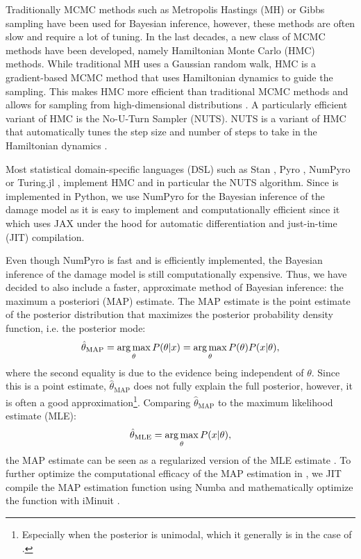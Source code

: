 Traditionally MCMC methods such as Metropolis Hastings (MH) or Gibbs sampling have been used for Bayesian inference, however, these methods are often slow and require a lot of tuning. In the last decades, a new class of MCMC methods have been developed, namely Hamiltonian Monte Carlo (HMC) methods. While traditional MH uses a Gaussian random walk, HMC is a gradient-based MCMC method that uses Hamiltonian dynamics to guide the sampling. This makes HMC more efficient than traditional MCMC methods and allows for sampling from high-dimensional distributions \autocite{betancourtConceptualIntroductionHamiltonian2018,nealMCMCUsingHamiltonian2011}. A particularly efficient variant of HMC is the No-U-Turn Sampler (NUTS). NUTS is a variant of HMC that automatically tunes the step size and number of steps to take in the Hamiltonian dynamics \autocite{homanNoUturnSamplerAdaptively2014}.

Most statistical domain-specific languages (DSL) such as Stan \autocite{carpenterStanProbabilisticProgramming2017}, Pyro \autocite{binghamPyroDeepUniversal2019}, NumPyro \autocite{phanComposableEffectsFlexible2019} or Turing.jl \autocite{geTuringLanguageFlexible2018}, implement HMC and in particular the NUTS algorithm. Since \metaDMG is implemented in Python, we use NumPyro for the Bayesian inference of the damage model as it is easy to implement and computationally efficient since it which uses JAX \autocite{bradburyJAXComposableTransformations2018} under the hood for automatic differentiation and just-in-time (JIT) compilation.

Even though NumPyro is fast and \metaDMG is efficiently implemented, the Bayesian inference of the damage model is still computationally expensive. Thus, we have decided to also include a faster, approximate method of Bayesian inference: the maximum a posteriori (MAP) estimate. The MAP estimate is the point estimate of the posterior distribution that maximizes the posterior probability density function, i.e. the posterior mode:
\begin{align}
    \hat{\theta}_\mathrm{MAP} = \operatorname*{arg\,max}_\theta P(\theta|x) = \operatorname*{arg\,max}_\theta P(\theta)P(x|\theta),
\end{align}
where the second equality is due to the evidence being independent of $\theta$. Since this is a point estimate, $\hat{\theta}_\mathrm{MAP}$ does not fully explain the full posterior, however, it is often a good approximation\footnote{Especially when the posterior is unimodal, which it generally is in the case of \metaDMG.}. Comparing $\hat{\theta}_\mathrm{MAP}$ to the maximum likelihood estimate (MLE):
\begin{align}
    \hat{\theta}_\mathrm{MLE} = \operatorname*{arg\,max}_\theta P(x|\theta),
\end{align}
the MAP estimate can be seen as a regularized version of the MLE estimate \autocite{murphyMachineLearningProbabilistic2012}. To further optimize the computational efficacy of the MAP estimation in \metaDMG, we JIT compile the MAP estimation function using Numba \autocite{lamNumbaLLVMbasedPython2015} and mathematically optimize the function with iMinuit \autocite{dembinskiScikithepIminuitV22021}.

